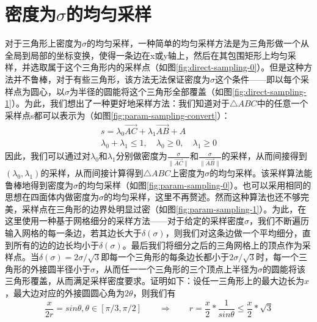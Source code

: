 \section{密度为$\sigma$的均匀采样}
对于三角形上密度为$\sigma$的均匀采样，一种简单的均匀采样方法是为三角形做一个从全局到局部的坐标变换，使得一条边在x或y轴上，然后在其包围矩形上均匀采样，并选取属于这个三角形内的采样点（如图\ref{fig:direct-sampling-0}）。但是这种方法并不鲁棒，对于有些三角形，该方法无法保证密度为$\sigma$这个条件——即以每个采样点为圆心，以$\sigma$为半径的圆能将这个三角形全部覆盖（如图\ref{fig:direct-sampling-1}）。为此，我们想出了一种更好地采样方法：我们知道对于$\triangle ABC$中的任意一个采样点s都可以表示为（如图\ref{fig:param-sampling-convert}）：
\begin{equation}
  \begin{split}
    s = \lambda_0 \overrightarrow{AC}+\lambda_1 \overrightarrow{AB} + A\\
    \lambda_0 + \lambda_1 \leq 1, \quad \lambda_0 \geq 0, \quad \lambda_1 \geq 0
  \end{split}
\end{equation}
因此，我们可以通过对$\lambda_0$和$\lambda_1$分别做密度为$\frac{\sigma}{\parallel \overrightarrow{AC} \parallel}$和$\frac{\sigma}{\parallel \overrightarrow{AB} \parallel}$的采样，从而间接得到$(\lambda_0,\lambda_1)$的采样，从而间接计算得到$\triangle ABC$上密度为$\sigma$的均匀采样。该采样算法能鲁棒地得到密度为$\sigma$的均匀采样（如图\ref{fig:param-sampling-0}）。也可以采用相同的思想在四面体内做密度为$\sigma$的均匀采样，这里不再赘述。然而这种算法也还不够完美，采样点在三角形的边界处明显过密（如图\ref{fig:param-sampling-1}）。为此，在这里使用一种基于网格细分的采样方法——对于给定的采样密度$\sigma$，我们不断遍历输入网格的每一条边，若其边长大于$\delta(\sigma)$，则我们对这条边做一个平均细分，直到所有的边的边长均小于$\delta(\sigma)$。最后我们将细分之后的三角网格上的顶点作为采样点。当$\delta(\sigma)=2\sigma/\sqrt{3}$即每一个三角形的每条边长都小于$2\sigma/\sqrt{3}$时，每一个三角形的外接圆半径小于$\sigma$，从而任一一个三角形的三个顶点上半径为$\sigma$的圆能将该三角形覆盖，从而满足采样密度要求。证明如下：设任一三角形上的最大边长为$x$，最大边对应的外接圆圆心角为$2\theta$，则我们有
\begin{equation}
  \frac{x}{2r} = sin\theta, \theta \in [\pi/3, \pi/2] \qquad
  \Rightarrow \qquad r =\frac{x}{2} * \frac{1}{sin \theta} \leq \frac{x}{2} * \sqrt{3}
\end{equation}

